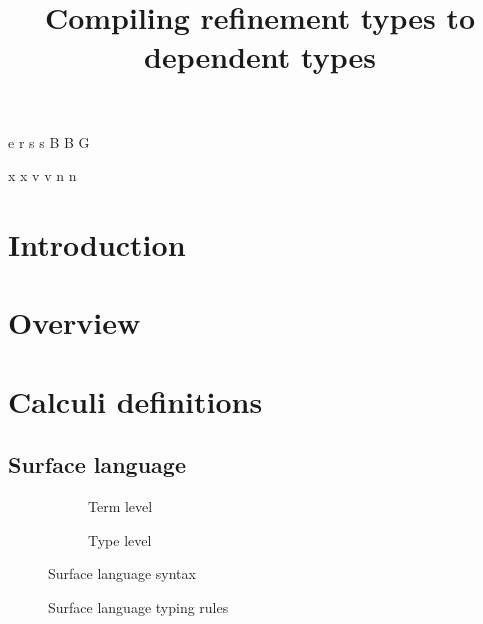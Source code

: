 \documentclass[a4paper]{article}
\begin{document}
\newnonterm e \varepsilon
{}
\newnonterm r \rho
{}
\newnonterm s s
\newnonterm B B
\newnonterm G \Gamma
{}

\newgterm x x
\newgterm v v
\newgterm n n


\title{Compiling refinement types to dependent types}

\maketitle

\section{Introduction}

\section{Overview}

\section{Calculi definitions}

\subsection{Surface language}

\begin{figure}[ht]
  \footnotesize
  \begin{subfigure}{.6\textwidth}
	\caption{Term level}
  \end{subfigure}
  \begin{subfigure}{.5\textwidth}
	\caption{Type level}
  \end{subfigure}
  \caption{Surface language syntax}
  \label{fig:surface_syntax}
\end{figure}

\begin{figure}[ht]
  \footnotesize
  \caption{Surface language typing rules}
  \label{fig:surface_typing}
\end{figure}
\end{document}
